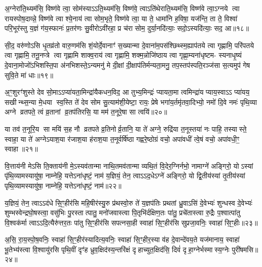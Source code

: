 {\anuvakamend[{मि॒त्रस्य॒ त्रयो॑विशतिश्च॥९॥}]}

अ॒ग्नेरा॑ति॒थ्यम॑सि॒ विष्ण॑वे त्वा॒ सोम॑स्याऽऽति॒थ्यम॑सि॒ विष्ण॑वे॒ त्वाऽति॑थेराति॒थ्यम॑सि॒ विष्ण॑वे त्वा॒ऽग्नये त्वा रायस्पोष॒दाव्न्ने॒ विष्ण॑वे त्वा श्ये॒नाय॑ त्वा सोम॒भृते॒ विष्ण॑वे त्वा॒ या ते॒ धामा॑नि ह॒विषा॒ यज॑न्ति॒ ता ते॒ विश्वा॑ परि॒भूर॑स्तु य॒ज्ञं ग॑य॒स्फानः॑ प्र॒तर॑णः सु॒वीरोऽवी॑रहा॒ प्र च॑रा सोम॒ दुर्या॒नदि॑त्याः॒ सदो॒ऽस्यदि॑त्याः॒ सद॒ आ॥१८॥

सी॒द॒ वरु॑णोऽसि धृ॒तव्र॑तो वारु॒णम॑सि शं॒योर्दे॒वानाꣳ॑ स॒ख्यान्मा दे॒वाना॑म॒पस॑श्छिथ्स्म॒ह्याप॑तये त्वा गृह्णामि॒ परि॑पतये त्वा गृह्णामि॒ तनू॒नप्त्रे त्वा गृह्णामि शाक्व॒राय॑ त्वा गृह्णामि॒ शक्म॒न्नोजि॑ष्ठाय त्वा गृह्णा॒म्यना॑धृष्टम- स्यनाधृ॒ष्यं दे॒वाना॒मोजो॑ऽभिशस्ति॒पा अ॑नभिशस्ते॒ऽन्यमनु॑ मे दी॒क्षां दी॒क्षाप॑तिर्मन्यता॒मनु॒ तप॒स्तप॑स्पति॒रञ्ज॑सा स॒त्यमुप॑ गेष सुवि॒ते मा॑ धाः॥१९॥

{\anuvakamend[{आ मैकं॑ च॥10॥}]}

अ॒ꣳ॒शुरꣳ॑शुस्ते देव सो॒माऽऽप्या॑यता॒मिन्द्रा॑यैकधन॒विद॒ आ तुभ्य॒मिन्द्रः॑ प्यायता॒मा त्वमिन्द्रा॑य प्याय॒स्वाऽऽ प्या॑यय॒ सखीन्थ्स॒न्या मे॒धया स्व॒स्ति ते॑ देव सोम सु॒त्याम॑शी॒येष्टा॒ रायः॒ प्रेषे भगा॑य॒र्तमृ॑तवा॒दिभ्यो॒ नमो॑ दि॒वे नमः॑ पृथि॒व्या अग्ने व्रतपते॒ त्वं व्र॒तानां व्र॒तप॑तिरसि॒ या मम॑ त॒नूरे॒षा सा त्वयि॑॥२०॥

या तव॑ त॒नूरि॒य सा मयि॑ स॒ह नौ व्रतपते व्र॒तिनोर्व्र॒तानि॒ या ते॑ अग्ने॒ रुद्रि॑या त॒नूस्तया॑ नः पाहि॒ तस्यास्ते॒ स्वाहा॒ या ते॑ अग्नेऽयाश॒या र॑जाश॒या ह॑राश॒या त॒नूर्वर्\mbox{}षि॑ष्ठा गह्वरे॒ष्ठोग्रं वचो॒ अपा॑वधीं त्वे॒षं वचो॒ अपा॑वधी॒ꣳ॒ स्वाहा॥२१॥

{\anuvakamend[{त्वयि॑ चत्वारि॒ꣳ॒शच्च॑॥11॥}]}

वि॒त्ताय॑नी मेऽसि ति॒क्ताय॑नी मे॒ऽस्यव॑तान्मा नाथि॒तमव॑तान्मा व्यथि॒तं वि॒देर॒ग्निर्नभो॒ नामाग्ने॑ अङ्गिरो॒ योऽस्यां पृ॑थि॒व्यामस्यायु॑षा॒ नाम्नेहि॒ यत्तेऽना॑धृष्टं॒ नाम॑ य॒ज्ञियं॒ तेन॒ त्वाऽऽद॒धेऽग्ने॑ अङ्गिरो॒ यो द्वि॒तीय॑स्यां तृ॒तीय॑स्यां पृथि॒व्यामस्यायु॑षा॒ नाम्नेहि॒ यत्तेऽना॑धृष्टं॒ नाम॑॥२२॥

य॒ज्ञियं॒ तेन॒ त्वाऽऽद॑धे सि॒ꣳ॒हीर॑सि महि॒षीर॑स्यु॒रु प्र॑थस्वो॒रु ते॑ य॒ज्ञप॑तिः प्रथतां ध्रु॒वाऽसि॑ दे॒वेभ्यः॑ शुन्धस्व दे॒वेभ्यः॑ शुम्भस्वेन्द्रघो॒षस्त्वा॒ वसु॑भिः पु॒रस्तात्पातु॒ मनो॑जवास्त्वा पि॒तृभि॑र्दक्षिण॒तः पा॑तु॒ प्रचे॑तास्त्वा रु॒द्रैः प॒श्वात्पा॑तु वि॒श्वक॑र्मा त्वाऽऽदि॒त्यैरु॑त्तर॒तः पा॑तु सि॒ꣳ॒हीर॑सि सपत्नसा॒ही स्वाहा॑ सि॒ꣳ॒हीर॑सि सुप्रजा॒वनिः॒ स्वाहा॑ सि॒ꣳ॒हीः॥२३॥

अ॒सि॒ रा॒य॒स्पो॒ष॒वनिः॒ स्वाहा॑ सि॒ꣳ॒हीर॑स्यादित्य॒वनिः॒ स्वाहा॑ सि॒ꣳ॒हीर॒स्या व॑ह दे॒वान्दे॑वय॒ते यज॑मानाय॒ स्वाहा॑ भू॒तेभ्य॑स्त्वा वि॒श्वायु॑रसि पृथि॒वीं दृꣳ॑ह ध्रुव॒क्षिद॑स्य॒न्तरि॑क्षं दृहाच्युत॒क्षिद॑सि॒ दिवं॑ दृहा॒ग्नेर्भस्मास्य॒ग्नेः पुरी॑षमसि॥२४॥

